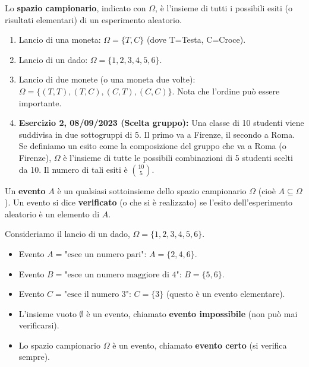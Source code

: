 \begin{definition}
Lo \textbf{spazio campionario}, indicato con $\Omega$, è l'insieme di tutti i possibili esiti (o risultati elementari) di un esperimento aleatorio.
\end{definition}

\begin{example}
\begin{enumerate}
    \item Lancio di una moneta: $\Omega = \{T, C\}$ (dove T=Testa, C=Croce).
    \item Lancio di un dado: $\Omega = \{1, 2, 3, 4, 5, 6\}$.
    \item Lancio di due monete (o una moneta due volte): $\Omega = \{(T,T), (T,C), (C,T), (C,C)\}$. Nota che l'ordine può essere importante.
    \item \textbf{Esercizio 2, 08/09/2023 (Scelta gruppo):} Una classe di 10 studenti viene suddivisa in due sottogruppi di 5. Il primo va a Firenze, il secondo a Roma. Se definiamo un esito come la composizione del gruppo che va a Roma (o Firenze), $\Omega$ è l'insieme di tutte le possibili combinazioni di 5 studenti scelti da 10. Il numero di tali esiti è $\binom{10}{5}$.
\end{enumerate}
\end{example}

\begin{definition}[Evento]
Un \textbf{evento} $A$ è un qualsiasi sottoinsieme dello spazio campionario $\Omega$ (cioè $A \subseteq \Omega$). Un evento si dice \textbf{verificato} (o che si è realizzato) se l'esito dell'esperimento aleatorio è un elemento di $A$.
\end{definition}

\begin{example}
Consideriamo il lancio di un dado, $\Omega = \{1, 2, 3, 4, 5, 6\}$.
\begin{itemize}
    \item Evento $A = \text{"esce un numero pari"}$: $A = \{2, 4, 6\}$.
    \item Evento $B = \text{"esce un numero maggiore di 4"}$: $B = \{5, 6\}$.
    \item Evento $C = \text{"esce il numero 3"}$: $C = \{3\}$ (questo è un evento elementare).
    \item L'insieme vuoto $\emptyset$ è un evento, chiamato \textbf{evento impossibile} (non può mai verificarsi).
    \item Lo spazio campionario $\Omega$ è un evento, chiamato \textbf{evento certo} (si verifica sempre).
\end{itemize}
\end{example}

